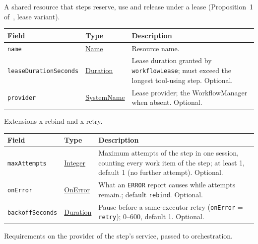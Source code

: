 \documentclass[a4paper]{arrowhead}
\newcommand{\mref}[1]{{\textcolor{ArrowheadPurple}{\hyperref[sec:model:#1]{#1}}}}
\newcommand{\pref}[1]{{\textcolor{ArrowheadGrey}{\hyperref[sec:model:primitives:#1]{#1}}}}
\begin{document}
A shared resource that steps reserve, use and release under a lease (Proposition~1 of~\cite{varga2026}, lease variant).

{\small
\begin{longtable}{|p{3.9cm}|p{4.4cm}|p{7.5cm}|}

\hline
\rowcolor{gray!33} Field & Type & Description \\ \hline
\endhead
\texttt{name} & \pref{Name} & Resource name. \\ \hline
\texttt{lease\allowbreak{}Duration\allowbreak{}Seconds} & \pref{Duration} & Lease duration granted by \texttt{workflowLease}; must exceed the longest tool-using step. Optional. \\ \hline
\texttt{provider} & \pref{SystemName} & Lease provider; the WorkflowManager when absent. Optional. \\ \hline
\end{longtable}
}

Extensions x-rebind and x-retry.

{\small
\begin{longtable}{|p{3.9cm}|p{4.4cm}|p{7.5cm}|}

\hline
\rowcolor{gray!33} Field & Type & Description \\ \hline
\endhead
\texttt{maxAttempts} & \pref{Integer} & Maximum attempts of the step in one session, counting every work item of the step; at least 1, default 1 (no further attempt). Optional. \\ \hline
\texttt{onError} & \mref{OnError} & What an \texttt{ERROR} report causes while attempts remain.; default \texttt{rebind}. Optional. \\ \hline
\texttt{backoff\allowbreak{}Seconds} & \pref{Duration} & Pause before a same-executor retry (\texttt{onError} = \texttt{retry}); 0--600, default 1. Optional. \\ \hline
\end{longtable}
}

Requirements on the provider of the step's service, passed to orchestration.
\end{document}
